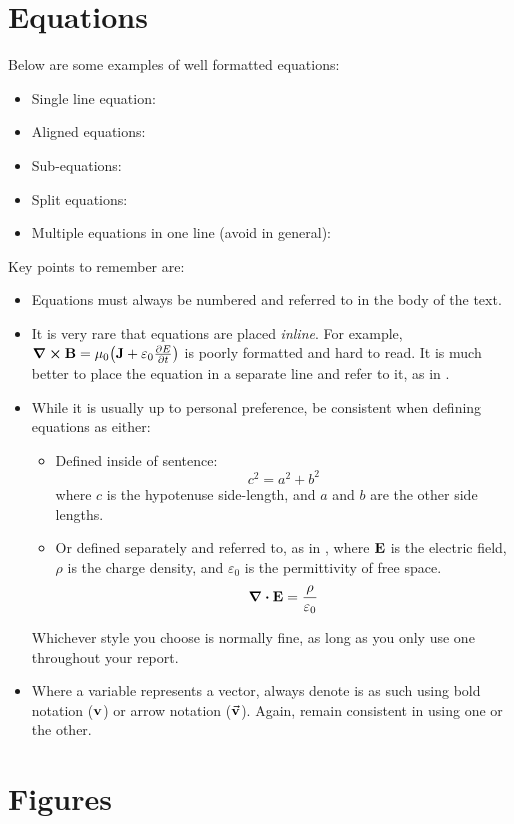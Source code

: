 \documentclass[draft,article]{UsydReport}
\begin{document}
\section{Equations}
Below are some examples of well formatted equations:
\begin{itemize}
    \item Single line equation: 
    \item Aligned equations: 
    \item Sub-equations: 
    \item Split equations: 
    \item Multiple equations in one line (avoid in general): 
\end{itemize}
Key points to remember are:
\begin{itemize}
    \item Equations must always be numbered and referred to in the body of the text.
    \item It is very rare that equations are placed \textit{inline}. For example, $\curl{\vb{B}} = \mu_0\qty(\vb{J} + \varepsilon_0 \pdv{E}{t})$ is poorly formatted and hard to read. It is much better to place the equation in a separate line and refer to it, as in .
    \item While it is usually up to personal preference, be consistent when defining equations as either:
    \begin{itemize}
        \item Defined inside of sentence:
            \begin{equation}
                c^2 = a^2 + b^2
            \end{equation}
        where $c$ is the hypotenuse side-length, and $a$ and $b$ are the other side lengths.
        \item Or defined separately and referred to, as in , where $\vb{E}$ is the electric field, $\rho$ is the charge density, and $\varepsilon_0$ is the permittivity of free space.
        \begin{equation}\label{eq:Refer}
            \div{\vb{E}} = \frac{\rho}{\varepsilon_0}
        \end{equation}
    \end{itemize}
    Whichever style you choose is normally fine, as long as you only use one throughout your report.
    \item Where a variable represents a vector, always denote is as such using bold notation ($\vb{v}$) or arrow notation ($\va{v}$). Again, remain consistent in using one or the other.
\end{itemize}

\section{Figures}


\clearpage
\backmatter{}
\printbibliography[heading=bibintoc]
\listoftodos[Notes]

\end{document}
